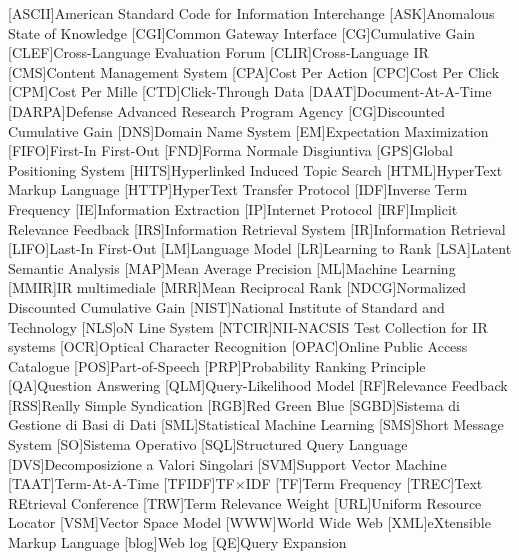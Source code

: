 [ASCII]{{American Standard Code for Information Interchange}}
[ASK]{{Anomalous State of Knowledge}}
[CGI]{{Common Gateway Interface}}
[CG]{{Cumulative Gain}}
[CLEF]{{Cross-Language Evaluation Forum}}
[CLIR]{{Cross-Language IR}}
[CMS]{{Content Management System}}
[CPA]{{Cost Per Action}}
[CPC]{{Cost Per Click}}
[CPM]{{Cost Per Mille}}
[CTD]{{Click-Through Data}}
[DAAT]{{Document-At-A-Time}}
[DARPA]{{Defense Advanced Research Program Agency}}
[CG]{{Discounted Cumulative Gain}}
[DNS]{{Domain Name System}}
[EM]{{Expectation Maximization}}
[FIFO]{{First-In First-Out}}
[FND]{Forma Normale Disgiuntiva}
[GPS]{{Global Positioning System}}
[HITS]{{Hyperlinked Induced Topic Search}}
[HTML]{{HyperText Markup Language}}
[HTTP]{{HyperText Transfer Protocol}}
[IDF]{{Inverse Term Frequency}}
[IE]{{Information Extraction}}
[IP]{{Internet Protocol}}
[IRF]{{Implicit Relevance Feedback}}
[IRS]{{Information Retrieval System}}
[IR]{{Information Retrieval}}
[LIFO]{{Last-In First-Out}}
[LM]{{Language Model}}
[LR]{{Learning to Rank}}
[LSA]{{Latent Semantic Analysis}}
[MAP]{{Mean Average Precision}}
[ML]{{Machine Learning}}
[MMIR]{\ac{IR} multimediale}
[MRR]{{Mean Reciprocal Rank}}
[NDCG]{{Normalized Discounted Cumulative Gain}}
[NIST]{{National Institute of Standard and Technology}}
[NLS]{{oN Line System}}
[NTCIR]{{\uppercase{NII-NACSIS} {T}est {C}ollection for {IR} systems}}
[OCR]{{Optical Character Recognition}}
[OPAC]{{Online Public Access Catalogue}}
[POS]{{Part-of-Speech}}
[PRP]{{Probability Ranking Principle}}
[QA]{{Question Answering}}
[QLM]{{Query-Likelihood Model}}
[RF]{{Relevance Feedback}}
[RSS]{{Really Simple Syndication}}
[RGB]{{Red Green Blue}}
[SGBD]{{Sistema di Gestione di Basi di Dati}}
[SML]{{Statistical Machine Learning}}
[SMS]{{Short Message System}}
[SO]{Sistema Operativo}
[SQL]{{Structured Query Language}}
[DVS]{{Decomposizione a Valori Singolari}}
[SVM]{{Support Vector Machine}}
[TAAT]{{Term-At-A-Time}}
[TFIDF]{{TF}$\times${IDF}}
[TF]{{Term Frequency}}
[TREC]{{Text REtrieval Conference}}
[TRW]{{Term Relevance Weight}}
[URL]{{Uniform Resource Locator}}
[VSM]{{Vector Space Model}}
[WWW]{{World Wide Web}}
[XML]{{eXtensible Markup Language}}
[{blog}]{{Web {log}}}
[QE]{Query Expansion}
